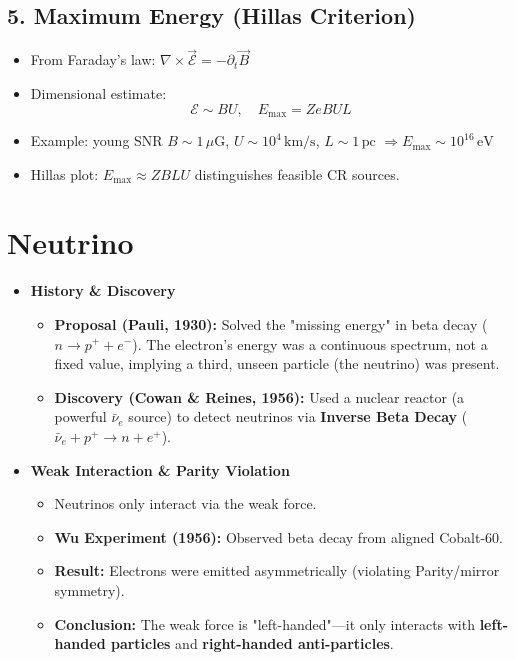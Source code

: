\documentclass{sciposter}
\begin{document}
\begin{multicols}{3}
\subsection*{5. Maximum Energy (Hillas Criterion)}
\begin{itemize}
    \item From Faraday’s law: $\nabla \times \vec{\mathcal{E}} = -\partial_t \vec{B}$
    \item Dimensional estimate:
    \[
        \mathcal{E} \sim BU, \quad E_{\max} = Z e B U L
    \]
    \item Example: young SNR  
    $B \sim 1\,\mu\mathrm{G}$, $U \sim 10^4\,\mathrm{km/s}$, $L \sim 1\,\mathrm{pc}$  
    $\Rightarrow E_{\max} \sim 10^{16}\,\mathrm{eV}$
    \item Hillas plot: $E_{\max} \approx Z B L U$ distinguishes feasible CR sources.
\end{itemize}

\section{Neutrino}


\begin{itemize}
    \item \textbf{History \& Discovery}
    \begin{itemize}
        \item \textbf{Proposal (Pauli, 1930):} Solved the "missing energy" in beta decay ($n \rightarrow p^+ + e^-$). The electron's energy was a continuous spectrum, not a fixed value, implying a third, unseen particle (the neutrino) was present.
        \item \textbf{Discovery (Cowan \& Reines, 1956):} Used a nuclear reactor (a powerful $\bar{\nu}_e$ source) to detect neutrinos via \textbf{Inverse Beta Decay} ($\bar{\nu}_e + p^+ \rightarrow n + e^+$).
    \end{itemize}

    \item \textbf{Weak Interaction \& Parity Violation}
    \begin{itemize}
        \item Neutrinos only interact via the weak force.
        \item \textbf{Wu Experiment (1956):} Observed beta decay from aligned Cobalt-60.
        \item \textbf{Result:} Electrons were emitted asymmetrically (violating Parity/mirror symmetry).
        \item \textbf{Conclusion:} The weak force is "left-handed"---it only interacts with \textbf{left-handed particles} and \textbf{right-handed anti-particles}.
    \end{itemize}


\end{itemize}
\end{multicols}
\end{document}
